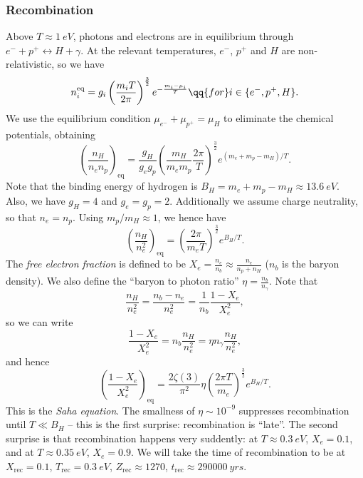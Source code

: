 \documentclass{jknotes}
\begin{document}
\subsubsection*{Recombination}
Above \(T\approx\SI{1}{eV}\), photons and electrons are in equilibrium through \(e^- + p^+ \leftrightarrow H + \gamma\). At the relevant temperatures, \(e^-\), \(p^+\) and \(H\) are non-relativistic, so we have
\begin{equation}
    n_i^{\text{eq}} = g_i\left(\frac{m_i T}{2\pi}\right)^{\frac32}e^{-\frac{m_i-\mu_i}{T}} \qq{for} i \in \{e^-,p^+,H\}.
\end{equation}
We use the equilibrium condition \(\mu_{e^-} + \mu_{p^+} = \mu_H\) to eliminate the chemical potentials, obtaining
\begin{equation}
    \left(\frac{n_H}{n_en_p}\right)_{\text{eq}} = \frac{g_H}{g_eg_p} \left(\frac{m_H}{m_em_p}\frac{2\pi}{T}\right)^{\frac32} e^{(m_e+m_p-m_H)/T}.
\end{equation}
Note that the binding energy of hydrogen is \(B_H = m_e+m_p-m_H \approx \SI{13.6}{eV}\). Also, we have \(g_H=4\) and \(g_e = g_p = 2\). Additionally we assume charge neutrality, so that \(n_e = n_p\). Using \(m_p/m_H\approx 1\), we hence have
\begin{equation}
    \left(\frac{n_H}{n_e^2}\right)_{\text{eq}} = \left(\frac{2\pi}{m_e T}\right)^{\frac32} e^{B_H/T}.
\end{equation}
The \emph{free electron fraction} is defined to be \(X_e = \frac{n_e}{n_b} \approx \frac{n_e}{n_p+n_H}\) (\(n_b\) is the baryon density). We also define the ``baryon to photon ratio'' \(\eta = \frac{n_b}{n_\gamma}\). Note that
\begin{equation}
    \frac{n_H}{n_e^2} = \frac{n_b-n_e}{n_e^2} = \frac1{n_b}\frac{1-X_e}{X_e^2},
\end{equation}
so we can write 
\begin{equation}
    \frac{1-X_e}{X_e^2} = n_b \frac{n_H}{n_e^2} = \eta n_\gamma \frac{n_H}{n_e^2},
\end{equation}
and hence
\begin{equation}
    \left(\frac{1-X_e}{X_e^2}\right)_{\text{eq}} = \frac{2\zeta(3)}{\pi^2}\eta\left(\frac{2\pi T}{m_e}\right)^{\frac32} e^{B_H/T}.
\end{equation}
This is the \emph{Saha equation}. The smallness of \(\eta \sim 10^{-9}\) suppresses recombination until \(T\ll B_H\) -- this is the first surprise: recombination is ``late''. The second surprise is that recombination happens very suddently: at \(T\approx \SI{0.3}{eV}\), \(X_e=0.1\), and at \(T\approx \SI{0.35}{eV}\), \(X_e = 0.9\). We will take the time of recombination to be at \(X_{\text{rec}} = 0.1\), \(T_{\text{rec}}=\SI{0.3}{eV}\), \(Z_{\text{rec}} \approx 1270\), \(t_{\text{rec}} \approx \SI{290000}{yrs}\).
\end{document}
